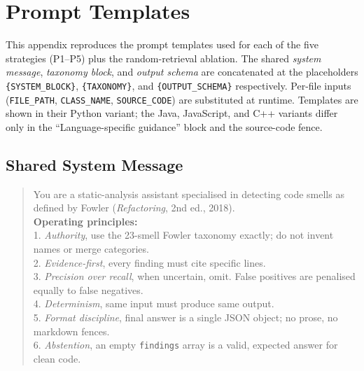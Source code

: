 \documentclass[conference]{IEEEtran}
\begin{document}



\appendices

\section{Prompt Templates}
\label{app:prompts}

This appendix reproduces the prompt templates used for each of the five
strategies (P1--P5) plus the random-retrieval ablation. The shared
\textit{system message}, \textit{taxonomy block}, and \textit{output schema}
are concatenated at the placeholders \texttt{\{SYSTEM\_BLOCK\}},
\texttt{\{TAXONOMY\}}, and \texttt{\{OUTPUT\_SCHEMA\}} respectively. Per-file
inputs (\texttt{FILE\_PATH}, \texttt{CLASS\_NAME}, \texttt{SOURCE\_CODE}) are
substituted at runtime. Templates are shown in their Python variant; the
Java, JavaScript, and C++ variants differ only in the
``Language-specific guidance'' block and the source-code fence.

\subsection{Shared System Message}

\begin{quote}\small\ttfamily
You are a static-analysis assistant specialised in detecting code smells as
defined by Fowler (\textit{Refactoring}, 2nd ed., 2018).\\[0.3em]
\textbf{Operating principles:}\\
1. \textit{Authority}, use the 23-smell Fowler taxonomy exactly; do not
invent names or merge categories.\\
2. \textit{Evidence-first}, every finding must cite specific lines.\\
3. \textit{Precision over recall}, when uncertain, omit. False positives
are penalised equally to false negatives.\\
4. \textit{Determinism}, same input must produce same output.\\
5. \textit{Format discipline}, final answer is a single JSON object;
no prose, no markdown fences.\\
6. \textit{Abstention}, an empty \texttt{findings} array is a valid,
expected answer for clean code.
\end{quote}
\end{document}
